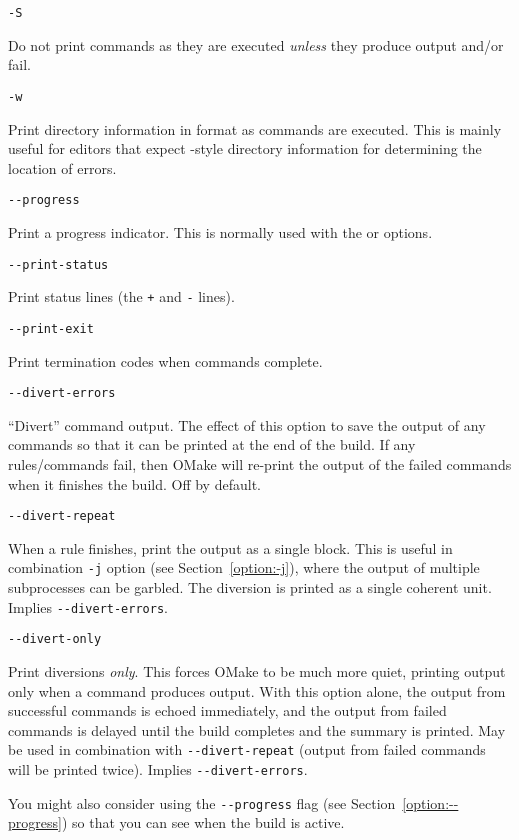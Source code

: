  \verb+-S+

Do not print commands as they are executed \emph{unless} they produce output and/or
fail.

 \verb+-w+

Print directory information in  format as commands are executed.
This is mainly useful for editors that expect -style
directory information for determining the location of errors.

 \verb+--progress+

Print a progress indicator.
This is normally used with the  or  options.

 \verb+--print-status+

Print status lines (the \verb/+/ and \verb/-/ lines).

 \verb+--print-exit+

Print termination codes when commands complete.

 \verb+--divert-errors+

``Divert'' command output.  The effect of this option to save the output of any commands so that it
can be printed at the end of the build.  If any rules/commands fail, then OMake will re-print the
output of the failed commands when it finishes the build.  Off by default.

 \verb+--divert-repeat+

When a rule finishes, print the output as a single block.  This is useful
in combination \verb+-j+ option (see Section~\ref{option:-j}), where the output of multiple subprocesses can be
garbled.  The diversion is printed as a single coherent unit.  Implies \verb+--divert-errors+.

 \verb+--divert-only+ 

Print diversions \emph{only}.  This forces OMake to be much more quiet,
printing output only when a command produces output.  With this option alone, the output from
successful commands is echoed immediately, and the output from failed commands is delayed until the
build completes and the summary is printed.  May be used in combination with \verb+--divert-repeat+
(output from failed commands will be printed twice).  Implies \verb+--divert-errors+.

You might also consider using the \verb+--progress+ flag (see Section~\ref{option:--progress}) so that you can see
when the build is active.

